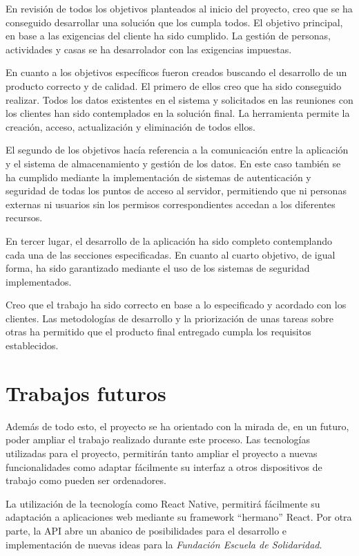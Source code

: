 En revisión de todos los objetivos planteados al inicio del proyecto, creo que se ha conseguido desarrollar una solución que los cumpla todos. El objetivo principal, en base a las exigencias del cliente ha sido cumplido. La gestión de personas, actividades y casas se ha desarrolador con las exigencias impuestas.

En cuanto a los objetivos específicos fueron creados buscando el desarrollo de un producto correcto y de calidad. El primero de ellos creo que ha sido conseguido realizar. Todos los datos existentes en el sistema y solicitados en las reuniones con los clientes han sido contemplados en la solución final. La herramienta permite la creación, acceso, actualización y eliminación de todos ellos.

El segundo de los objetivos hacía referencia a la comunicación entre la aplicación y el sistema de almacenamiento y gestión de los datos. En este caso también se ha cumplido mediante la implementación de sistemas de autenticación y seguridad de todas los puntos de acceso al servidor, permitiendo que ni personas externas ni usuarios sin los permisos correspondientes accedan a los diferentes recursos.

En tercer lugar, el desarrollo de la aplicación ha sido completo contemplando cada una de las secciones especificadas. En cuanto al cuarto objetivo, de igual forma, ha sido garantizado mediante el uso de los sistemas de seguridad implementados.

Creo que el trabajo ha sido correcto en base a lo especificado y acordado con los clientes. Las metodologías de desarrollo y la priorización de unas tareas sobre otras ha permitido que el producto final entregado cumpla los requisitos establecidos.

\section{Trabajos futuros}

Además de todo esto, el proyecto se ha orientado con la mirada de, en un futuro, poder ampliar el trabajo realizado durante este proceso. Las tecnologías utilizadas para el proyecto, permitirán tanto ampliar el proyecto a nuevas funcionalidades como adaptar fácilmente su interfaz a otros dispositivos de trabajo como pueden ser ordenadores.

La utilización de la tecnología como React Native, permitirá fácilmente su adaptación a aplicaciones web mediante su framework ``hermano'' React. Por otra parte, la API abre un abanico de posibilidades para el desarrollo e implementación de nuevas ideas para la \textit{Fundación Escuela de Solidaridad}.